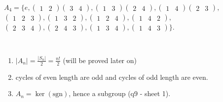 \begin{example}
\(A_4 = \{ e, \begin{pmatrix}1 & 2\end{pmatrix} \begin{pmatrix}3 & 4\end{pmatrix}, \begin{pmatrix}1 & 3\end{pmatrix} \begin{pmatrix}2 & 4\end{pmatrix}, \begin{pmatrix}1 & 4\end{pmatrix} \begin{pmatrix}2 & 3\end{pmatrix},\) \(\begin{pmatrix}1 & 2 & 3\end{pmatrix}, \begin{pmatrix}1 & 3 & 2\end{pmatrix}, \begin{pmatrix}1 & 2 & 4\end{pmatrix}, \begin{pmatrix}1 & 4 & 2\end{pmatrix},\) \(\begin{pmatrix}2 & 3 & 4\end{pmatrix}, \begin{pmatrix}2 & 4 & 3\end{pmatrix}, \begin{pmatrix}1 & 3 & 4\end{pmatrix}, \begin{pmatrix}1 & 4 & 3\end{pmatrix} \}\).
\end{example}

\begin{remark}

~

\begin{enumerate}
\def\labelenumi{\roman{enumi}.}
\item
  \(|A_n| = \frac{|S_n|}{2} = \frac{n!}{2}\) (will be proved later on)
\item
  cycles of even length are odd and cycles of odd length are even.
\item
  \(A_n = \ker (\text{sgn})\), hence a subgroup (q9 - sheet 1).
\end{enumerate}

\end{remark}